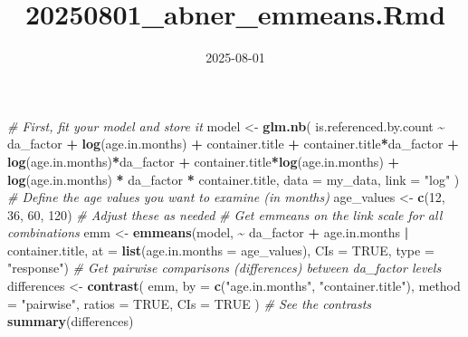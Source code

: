 \documentclass[
]{article}
\title{20250801\_abner\_emmeans.Rmd}
\author{}
\date{\vspace{-2.5em}2025-08-01}
\newenvironment{Shaded}{\begin{snugshade}}{\end{snugshade}}
\newcommand{\AttributeTok}[1]{\textcolor[rgb]{0.13,0.29,0.53}{#1}}
\newcommand{\CommentTok}[1]{\textcolor[rgb]{0.56,0.35,0.01}{\textit{#1}}}
\newcommand{\ConstantTok}[1]{\textcolor[rgb]{0.56,0.35,0.01}{#1}}
\newcommand{\DecValTok}[1]{\textcolor[rgb]{0.00,0.00,0.81}{#1}}
\newcommand{\FunctionTok}[1]{\textcolor[rgb]{0.13,0.29,0.53}{\textbf{#1}}}
\newcommand{\NormalTok}[1]{#1}
\newcommand{\OtherTok}[1]{\textcolor[rgb]{0.56,0.35,0.01}{#1}}
\newcommand{\SpecialCharTok}[1]{\textcolor[rgb]{0.81,0.36,0.00}{\textbf{#1}}}
\newcommand{\StringTok}[1]{\textcolor[rgb]{0.31,0.60,0.02}{#1}}
\begin{document}
\maketitle

\begin{Shaded}
\begin{Highlighting}[]
\CommentTok{\# First, fit your model and store it}
\NormalTok{model }\OtherTok{\textless{}{-}} \FunctionTok{glm.nb}\NormalTok{(}
\NormalTok{    is.referenced.by.count }\SpecialCharTok{\textasciitilde{}}\NormalTok{ da\_factor }\SpecialCharTok{+} \FunctionTok{log}\NormalTok{(age.in.months) }\SpecialCharTok{+}\NormalTok{ container.title }\SpecialCharTok{+}
\NormalTok{        container.title}\SpecialCharTok{*}\NormalTok{da\_factor }\SpecialCharTok{+} \FunctionTok{log}\NormalTok{(age.in.months)}\SpecialCharTok{*}\NormalTok{da\_factor }\SpecialCharTok{+}
\NormalTok{        container.title}\SpecialCharTok{*}\FunctionTok{log}\NormalTok{(age.in.months) }\SpecialCharTok{+}
        \FunctionTok{log}\NormalTok{(age.in.months) }\SpecialCharTok{*}\NormalTok{ da\_factor }\SpecialCharTok{*}\NormalTok{ container.title,}
    \AttributeTok{data =}\NormalTok{ my\_data,}
    \AttributeTok{link =} \StringTok{"log"}
\NormalTok{)}
\CommentTok{\# Define the age values you want to examine (in months)}
\NormalTok{age\_values }\OtherTok{\textless{}{-}} \FunctionTok{c}\NormalTok{(}\DecValTok{12}\NormalTok{, }\DecValTok{36}\NormalTok{, }\DecValTok{60}\NormalTok{, }\DecValTok{120}\NormalTok{)  }\CommentTok{\# Adjust these as needed}
\CommentTok{\# Get emmeans on the link scale for all combinations}
\NormalTok{emm }\OtherTok{\textless{}{-}} \FunctionTok{emmeans}\NormalTok{(model,  }\SpecialCharTok{\textasciitilde{}}\NormalTok{ da\_factor }\SpecialCharTok{+}\NormalTok{ age.in.months }\SpecialCharTok{|}\NormalTok{ container.title,}
        \AttributeTok{at =} \FunctionTok{list}\NormalTok{(}\AttributeTok{age.in.months =}\NormalTok{ age\_values), }\AttributeTok{CIs =} \ConstantTok{TRUE}\NormalTok{,}
        \AttributeTok{type =} \StringTok{"response"}\NormalTok{)}
\CommentTok{\# Get pairwise comparisons (differences) between da\_factor levels}
\NormalTok{differences }\OtherTok{\textless{}{-}} \FunctionTok{contrast}\NormalTok{(}
\NormalTok{    emm, }\AttributeTok{by =} \FunctionTok{c}\NormalTok{(}\StringTok{"age.in.months"}\NormalTok{, }\StringTok{"container.title"}\NormalTok{),}
    \AttributeTok{method =} \StringTok{"pairwise"}\NormalTok{,}
    \AttributeTok{ratios =} \ConstantTok{TRUE}\NormalTok{, }\AttributeTok{CIs =} \ConstantTok{TRUE}
\NormalTok{)}
\CommentTok{\# See the contrasts}
\FunctionTok{summary}\NormalTok{(differences)}
\end{Highlighting}
\end{Shaded}
\end{document}
